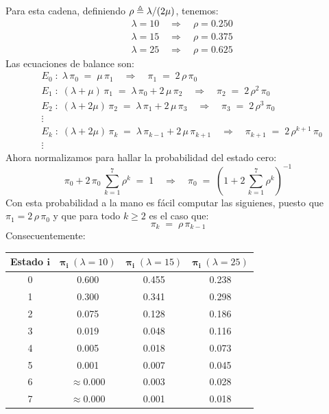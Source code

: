 \documentclass[ a4paper, twoside, 11pt]{article}
\begin{document}
\begin{problem}
\begin{enumerate}[label=\textbf{\alph*)}]
Para esta cadena, definiendo $\rho \triangleq \lambda / ( 2 \mu )$, tenemos: 
\begin{align*}
& \lambda = 10 \quad \Longrightarrow \quad \rho = 0.250 \\
& \lambda = 15 \quad \Longrightarrow \quad \rho = 0.375 \\
& \lambda = 25 \quad \Longrightarrow \quad \rho = 0.625
\end{align*}
Las ecuaciones de balance son: 
\begin{align*}
& E_0 \; \colon \; \lambda \, \pi_0 \; = \; \mu \, \pi_1
\quad \Longrightarrow \quad
\pi_1 \; = \; 2 \, \rho \, \pi_0 \\
& E_1 \; \colon \; (\lambda + \mu) \, \pi_1
\; = \; \lambda \, \pi_0 + 2 \, \mu \, \pi_2
\quad \Longrightarrow \quad
\pi_2 \; = \; 2 \, \rho^2 \, \pi_0 \\
& E_2 \; \colon \; (\lambda + 2 \mu) \, \pi_2
\; = \; \lambda \, \pi_1 + 2 \, \mu \, \pi_3
\quad \Longrightarrow \quad
\pi_3 \; = \; 2 \, \rho^3 \, \pi_0 \\
& \vdots \\
& E_k \; \colon \; (\lambda + 2\mu) \, \pi_{k} \; = \; \lambda \, \pi_{k-1} + 2 \, \mu \, \pi_{k+1} \quad \Longrightarrow \quad
\pi_{k+1} \; = \; 2 \, \rho^{k+1} \, \pi_0 \\
& \vdots
\end{align*}
Ahora normalizamos para hallar la probabilidad del estado cero: 
\[
\pi_0 + 
2 \, \pi_0 \, \sum_{k=1}^7 \rho^k \; = \; 1 \quad \Longrightarrow \quad
\pi_0 \; = \; \left( 1 + 2 \, \sum_{k=1}^7 \rho^k \right)^{-1}
\]
Con esta probabilidad a la mano es f\'acil computar las siguienes, puesto que $\pi_1 = 2 \, \rho \, \pi_0$ y que para todo $k \geq 2$ es el caso que: 
\[
\pi_{k} \; = \; \rho \, \pi_{k-1}
\]
Consecuentemente: 
\begin{table}[htb]
\centering
\begin{tabular}{|c|c|c|c|}
\hline
\textbf{Estado} $\boldsymbol{i}$ & $\boldsymbol{\pi_i} \; ( \lambda = 10 )$ & $\boldsymbol{\pi_i} \; ( \lambda = 15 )$ & $\boldsymbol{\pi_i} \; ( \lambda = 25 )$ \\ \hline
0 & 0.600 & 0.455 & 0.238 \\ \hline
1 & 0.300 & 0.341 & 0.298 \\ \hline
2 & 0.075 & 0.128 & 0.186 \\ \hline
3 & 0.019 & 0.048 & 0.116 \\ \hline
4 & 0.005 & 0.018 & 0.073 \\ \hline
5 & 0.001 & 0.007 & 0.045 \\ \hline
6 & $\approx$0.000 & 0.003 & 0.028 \\ \hline
7 & $\approx$0.000 & 0.001 & 0.018 \\ \hline
\end{tabular}
\end{table}


\end{enumerate}
\end{problem}
\end{document}
